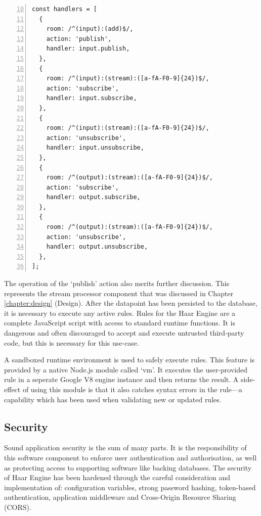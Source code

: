       \begin{lstlisting}[caption=Excerpt from `/lib/realtime/index.js',
        label=realtime-index,
        captionpos=b,
        numbers=left,
        frame=single,
        firstnumber=10,
        float]
const handlers = [
  {
    room: /^(input):(add)$/,
    action: 'publish',
    handler: input.publish,
  },
  {
    room: /^(input):(stream):([a-fA-F0-9]{24})$/,
    action: 'subscribe',
    handler: input.subscribe,
  },
  {
    room: /^(input):(stream):([a-fA-F0-9]{24})$/,
    action: 'unsubscribe',
    handler: input.unsubscribe,
  },
  {
    room: /^(output):(stream):([a-fA-F0-9]{24})$/,
    action: 'subscribe',
    handler: output.subscribe,
  },
  {
    room: /^(output):(stream):([a-fA-F0-9]{24})$/,
    action: 'unsubscribe',
    handler: output.unsubscribe,
  },
];
      \end{lstlisting}

      The operation of the `publish' action also merits further discussion. This represents the stream processor component that was discussed in Chapter \ref{chapter:design} (Design). After the datapoint has been persisted to the database, it is necessary to execute any active rules. Rules for the Haar Engine are a complete JavaScript script with access to standard runtime functions. It is dangerous and often discouraged to accept and execute untrusted third-party code, but this is necessary for this use-case.

      A sandboxed runtime environment is used to safely execute rules. This feature is provided by a native Node.js module called `vm'. It executes the user-provided rule in a seperate Google V8 engine instance and then returns the result. A side-effect of using this module is that it also catches syntax errors in the rule---a capability which has been used when validating new or updated rules.

    \subsection{Security}
      Sound application security is the sum of many parts. It is the responsibility of this software component to enforce user authentication and authorisation, as well as protecting access to supporting software like backing databases. The security of Haar Engine has been hardened through the careful consideration and implementation of: configuration variables, strong password hashing, token-based authentication, application middleware and Cross-Origin Resource Sharing (CORS).

